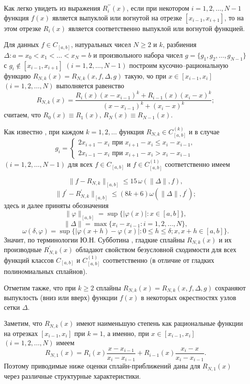 Как легко увидеть из выражения $R^{\prime\prime}_i(x)$, если при некотором $i=1,2,\dots,N-1$
функция $f(x)$ является выпуклой или вогнутой на отрезке $[x_{i-1}, x_{i+1}]$, то
на этом отрезке $R_i(x)$ является соответственно выпуклой или вогнутой функцией.

Для данных $f\in C_{[a,b]}$, натуральных чисел $N\geqslant 2$ и $k$, разбиения
$\Delta: a=x_0<x_1<\dots<x_N=b$ и произвольного набора чисел
$g=\{g_1,g_2,\dots,g_{N-1}\}$ с $g_i\not \in[x_{i-1}, x_{i+1}]$ $(i=1,2,\dots,N-1)$
построим кусочно--рациональную функцию
$R_{N,k} (x)=R_{N,k}(x,f,\Delta, g)$ такую, чо при $x\in [x_{i-1}, x_i]$
$(i=1,2,\dots,N)$ выполняется равенство
$$
R_{N,k}(x)=\frac{R_i(x)(x-x_{i-1})^k+R_{i-1}(x)(x_i-x)^k}{(x-x_{i-1})^k+(x_i-x)^k};
$$
считаем, что $R_0(x)\equiv R_1(x)$, $R_N(x)\equiv R_{N-1} (x)$.

Как известно \cite{rark9}, при каждом $k=1,2,\dots$ функция $R_{N,k}\in C^{(k)}_{[a,b]}$
и в случае
$$
g_i=\begin{cases} 2x_{i+1}-x_i \text{ при } x_{i+1}-x_i\leqslant x_i-x_{i-1},\\
2x_{i-1}-x_i \text{ при } x_{i+1}-x_i>x_i-x_{i-1}
\end{cases}
$$
$(i=1,2,\dots, N-1)$ для всех $f\in C_{[a,b]}$ и $f\in C^{(1)}_{[a,b]}$
соответственно имеем

\begin{equation}\label{rark1.3}
\|f-R_{N,k}\|_{[a,b]}\leqslant 15\,\omega(\|\Delta\|, f),
\end{equation}
$$
\|f^\prime-R^\prime_{N,k}\|_{[a,b]}\leqslant (8k+6)\omega (\|\Delta\|, f^\prime);
$$
здесь и далее приняты обозначения
$$
\|\varphi\|_{[a,b]}=\sup\{|\varphi (x)|: x\in[a,b]\},
$$
$$
\|\Delta\|=\max\{x_i-x_{i-1}: i=1,2,\dots, N\},
$$
$$
\omega(\delta, \varphi)=\sup\{|\varphi(x+h)-\varphi(x)|:
0\leqslant h\leqslant \delta; x, x+h\in[a,b]\}.
$$
Значит, по терминологии Ю.Н. Субботина \cite{rark11}, гладкие сплайны $R_{N,k} (x)$
и их производные $R^\prime_{N, k}(x)$ обладают свойством безусловной
сходимости для всех функций классов $C_{[a,b]}$ и $C^{(1)}_{[a,b]}$ соответственно
(в отличие от гладких полиномиальных сплайнов).

Отметим также, что при $k\geqslant 2$ сплайны $R_{N,k}(x)=R_{N,k}(x,f,\Delta, g)$
сохраняют выпуклость (вниз или вверх) функции $f(x)$ в некоторых окрестностях узлов сетки
$\Delta$.

Заметим, что $R_{N,k} (x)$ имеют наименьшую степень как рациональные функции
на отрезках $[x_{i-1},x_i]$ при $k=1$, а именно, при
$x\in [x_{i-1}, x_i]$ $(i=1,2,\dots,N)$ имеем
\begin{equation}\label{rark1.4}
R_{N,1}(x)=R_i(x)\frac{x-x_{i-1}}{x_i-x_{i-1}}+R_{i-1} (x)\frac{x_i-x}{x_i-x_{i-1}}.
\end{equation}
Поэтому приводимые ниже оценки сплайн-приближений даны для $R_{N,1} (x)$ через
различные структурные характеристики.

